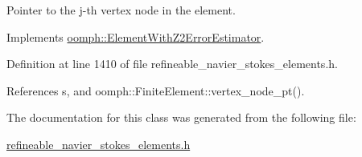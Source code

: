 Pointer to the j-\/th vertex node in the element. 



Implements \hyperlink{classoomph_1_1ElementWithZ2ErrorEstimator_a0eedccc33519f852c5dc2055ddf2774b}{oomph\+::\+Element\+With\+Z2\+Error\+Estimator}.



Definition at line 1410 of file refineable\+\_\+navier\+\_\+stokes\+\_\+elements.\+h.



References s, and oomph\+::\+Finite\+Element\+::vertex\+\_\+node\+\_\+pt().



The documentation for this class was generated from the following file\+:\begin{DoxyCompactItemize}
\item 
\hyperlink{refineable__navier__stokes__elements_8h}{refineable\+\_\+navier\+\_\+stokes\+\_\+elements.\+h}\end{DoxyCompactItemize}

